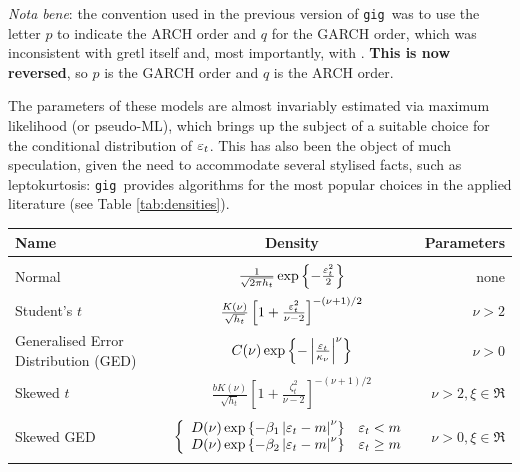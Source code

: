 \documentclass[a4paper,11pt]{article}
\newcommand{\app}[1]{\textsf{#1}}
\newcommand{\tip}[1]{\par\vspace{4pt}
 \ding{43} {\small \sffamily #1}\par\smallskip}
\newcommand{\stdu}{\ensuremath \varepsilon}
\newcommand{\gig}{\texttt{gig}}
\begin{document}
\tip{\emph{Nota bene}: the convention used in the previous version of \gig\
was to use the letter $p$ to indicate the ARCH order and $q$ for the
GARCH order, which was inconsistent with \app{gretl} itself and, most
importantly, with \cite{Bollerslev-86}. \textbf{This is now reversed},
so $p$ is the GARCH order and $q$ is the ARCH order.}


The parameters of these models are almost invariably estimated via
maximum likelihood (or pseudo-ML), which brings up the subject of a
suitable choice for the conditional distribution of $\stdu_t$.  This has
also been the object of much speculation, given the need to
accommodate several stylised facts, such as leptokurtosis:
\gig\ provides algorithms for the most popular choices in the
applied literature (see Table \ref{tab:densities}).

\begin{table}[hptb]
  \centering
  \begin{footnotesize}
  \begin{tabular}{p{}cr}
    \hline
    \textbf{Name} &  \textbf{Density}  &  \textbf{Parameters} \\
    \hline
    \\
    Normal &
    $\frac{1}{\sqrt{2\pi h_t}}
    \exp \left\{-\frac{\stdu_t^2}{2}\right\}$ &
    none \\
    Student's $t$ &
    $\frac{K(\nu)}{\sqrt{h_t}}
    \left[1+\frac{\stdu_t^2}{\nu-2}\right]^{-(\nu + 1)/2}$ &
    $\nu > 2$ \\
    Generalised Error Distribution (GED) &
    $C(\nu)\exp\left\{-\left|\frac{\stdu_t}{\kappa_\nu}\right|^\nu\right\}$
    & $\nu > 0$ \\
    Skewed $t$ &
    $\frac{b K(\nu)}{\sqrt{h_t}}
    \left[1 + \frac{\zeta_t^2}{\nu - 2}\right]^{-(\nu + 1)/2}$
    & $\nu > 2, \xi \in \Re$ \\
    \\
    Skewed GED &
    $\left\{
      \begin{array}{cc}
        D(\nu) \exp\left\{-\beta_1 \left|\stdu_t - m\right|^\nu\right\} &
          \stdu_t < m \\
        D(\nu) \exp\left\{-\beta_2 \left|\stdu_t - m\right|^\nu\right\} &
          \stdu_t \ge m
      \end{array}
    \right.$
    & $\nu > 0, \xi \in \Re$ \\
    \\
    \hline
    \hline
  \end{tabular}
  \end{footnotesize}

\end{table}
\end{document}
